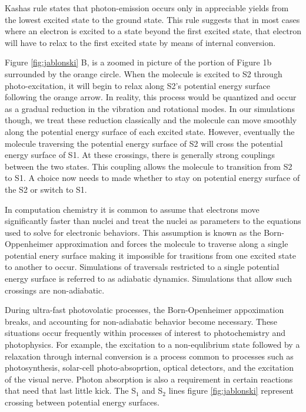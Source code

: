 Kashas rule states that photon-emission occurs only in appreciable yields from the lowest excited state to the ground state.\cite{Kasha1950}
This rule suggests that in most cases where an electron is excited to a state beyond the first excited state, that electron will have to relax to the first excited state by means of internal conversion.\cite{shenai2016internal}

Figure \ref{fig:jablonski} B, is a zoomed in picture of the portion of Figure 1b surrounded by the orange circle.
When the molecule is excited to S2 through photo-excitation, it will begin to relax along S2's potential energy surface following the orange arrow.
In reality, this process would be quantized and occur as a gradual reduction in the vibration and rotational modes.
In our simulations though, we treat these reduction classically and the molecule can move smoothly along the potential energy surface of each excited state. 
However, eventually the molecule traversing the potential energy surface of S2 will cross the potential energy surface of S1.
At these crossings, there is generally strong couplings between the two states.
This coupling allows the molecule to transition from S2 to S1.
A choice now needs to made whether to stay on potential energy surface of the S2 or switch to S1.

In computation chemistry it is common to assume that electrons move significantly faster than nuclei and treat the nuclei as parameters to the equations used to solve for electronic behaviors.
This assumption is known as the Born-Oppenheimer approximation and forces the molecule to traverse along a single potential enery surface making it impossible for trasitions from one excited state to another to occur.
Simulations of traversals restricted to a single potential energy surface is referred to as adiabatic dynamics.
Simulations that allow such crossings are non-adiabatic.

During ultra-fast photovolatic processes, the Born-Openheimer appoximation breaks, and accounting for non-adiabatic behavior become necessary.
These situations occur frequently within processes of interest to photochemistry and photophysics.
For example, the excitation to a non-equlibrium state followed by a relaxation through internal conversion is a process common to processes such as photosynthesis, solar-cell photo-absoprtion, optical detectors, and the excitation of the visual nerve.
Photon absorption is also a requirement in certain reactions that need that last little kick.\cite{vincent2016little}
The S\(_1\) and S\(_2\) lines figure \ref{fig:jablonski} represent crossing between potential energy surfaces.

